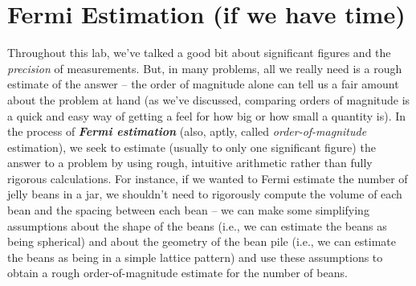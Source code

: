\documentclass[11pt]{article}
\begin{document}
\section{Fermi Estimation (if we have time)}
Throughout this lab, we've talked a good bit about significant figures and the \emph{precision} of measurements. But, in many problems, all we really need is a rough estimate of the answer -- the order of magnitude alone can tell us a fair amount about the problem at hand (as we've discussed, comparing orders of magnitude is a quick and easy way of getting a feel for how big or how small a quantity is). In the process of \textbf{\emph{Fermi estimation}} (also, aptly, called \emph{order-of-magnitude} estimation), we seek to estimate (usually to only one significant figure) the answer to a problem by using rough, intuitive arithmetic rather than fully rigorous calculations. For instance, if we wanted to Fermi estimate the number of jelly beans in a jar, we shouldn't need to rigorously compute the volume of each bean and the spacing between each bean -- we can make some simplifying assumptions about the shape of the beans (i.e., we can estimate the beans as being spherical) and about the geometry of the bean pile (i.e., we can estimate the beans as being in a simple lattice pattern) and use these assumptions to obtain a rough order-of-magnitude estimate for the number of beans.

\bigskip 
\end{document}
